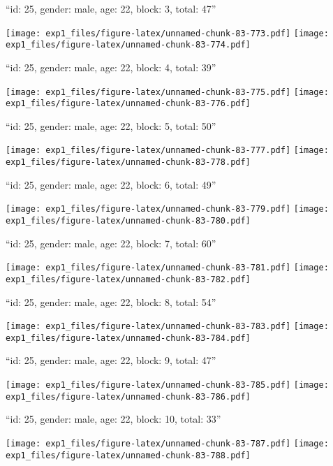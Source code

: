 \documentclass[11pt,,]{article}
\begin{document}
\newpage
[1] 

``id: 25, gender: male, age: 22, block: 3, total: 47''

\texttt{[image: exp1\_files/figure-latex/unnamed-chunk-83-773.pdf]}
\texttt{[image: exp1\_files/figure-latex/unnamed-chunk-83-774.pdf]}

\newpage
[1] 

``id: 25, gender: male, age: 22, block: 4, total: 39''

\texttt{[image: exp1\_files/figure-latex/unnamed-chunk-83-775.pdf]}
\texttt{[image: exp1\_files/figure-latex/unnamed-chunk-83-776.pdf]}

\newpage
[1] 

``id: 25, gender: male, age: 22, block: 5, total: 50''

\texttt{[image: exp1\_files/figure-latex/unnamed-chunk-83-777.pdf]}
\texttt{[image: exp1\_files/figure-latex/unnamed-chunk-83-778.pdf]}

\newpage
[1] 

``id: 25, gender: male, age: 22, block: 6, total: 49''

\texttt{[image: exp1\_files/figure-latex/unnamed-chunk-83-779.pdf]}
\texttt{[image: exp1\_files/figure-latex/unnamed-chunk-83-780.pdf]}

\newpage
[1] 

``id: 25, gender: male, age: 22, block: 7, total: 60''

\texttt{[image: exp1\_files/figure-latex/unnamed-chunk-83-781.pdf]}
\texttt{[image: exp1\_files/figure-latex/unnamed-chunk-83-782.pdf]}

\newpage
[1] 

``id: 25, gender: male, age: 22, block: 8, total: 54''

\texttt{[image: exp1\_files/figure-latex/unnamed-chunk-83-783.pdf]}
\texttt{[image: exp1\_files/figure-latex/unnamed-chunk-83-784.pdf]}

\newpage
[1] 

``id: 25, gender: male, age: 22, block: 9, total: 47''

\texttt{[image: exp1\_files/figure-latex/unnamed-chunk-83-785.pdf]}
\texttt{[image: exp1\_files/figure-latex/unnamed-chunk-83-786.pdf]}

\newpage
[1] 

``id: 25, gender: male, age: 22, block: 10, total: 33''

\texttt{[image: exp1\_files/figure-latex/unnamed-chunk-83-787.pdf]}
\texttt{[image: exp1\_files/figure-latex/unnamed-chunk-83-788.pdf]}
\end{document}
